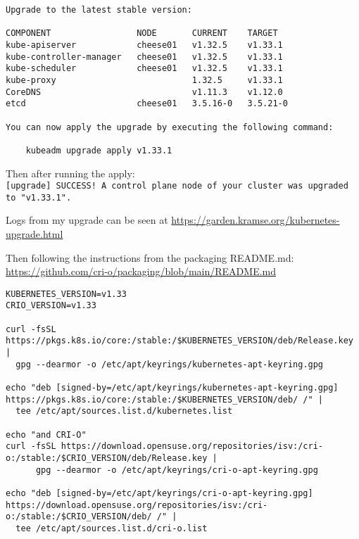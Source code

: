 \documentclass[Screen16to9,17pt]{foils}
\begin{document}

\begin{verbatim}
Upgrade to the latest stable version:

COMPONENT                 NODE       CURRENT    TARGET
kube-apiserver            cheese01   v1.32.5    v1.33.1
kube-controller-manager   cheese01   v1.32.5    v1.33.1
kube-scheduler            cheese01   v1.32.5    v1.33.1
kube-proxy                           1.32.5     v1.33.1
CoreDNS                              v1.11.3    v1.12.0
etcd                      cheese01   3.5.16-0   3.5.21-0

You can now apply the upgrade by executing the following command:

	kubeadm upgrade apply v1.33.1
\end{verbatim}

Then after running the apply:\\{\scriptsize
\verb+[upgrade] SUCCESS! A control plane node of your cluster was upgraded to "v1.33.1".+}

Logs from my upgrade can be seen at \url{https://garden.kramse.org/kubernetes-upgrade.html}


Then following the instructions from the packaging README.md:\\
\url{https://github.com/cri-o/packaging/blob/main/README.md}

\begin{verbatim}
KUBERNETES_VERSION=v1.33
CRIO_VERSION=v1.33

curl -fsSL https://pkgs.k8s.io/core:/stable:/$KUBERNETES_VERSION/deb/Release.key |
  gpg --dearmor -o /etc/apt/keyrings/kubernetes-apt-keyring.gpg

echo "deb [signed-by=/etc/apt/keyrings/kubernetes-apt-keyring.gpg]
https://pkgs.k8s.io/core:/stable:/$KUBERNETES_VERSION/deb/ /" |
  tee /etc/apt/sources.list.d/kubernetes.list

echo "and CRI-O"
curl -fsSL https://download.opensuse.org/repositories/isv:/cri-o:/stable:/$CRIO_VERSION/deb/Release.key |
      gpg --dearmor -o /etc/apt/keyrings/cri-o-apt-keyring.gpg

echo "deb [signed-by=/etc/apt/keyrings/cri-o-apt-keyring.gpg]
https://download.opensuse.org/repositories/isv:/cri-o:/stable:/$CRIO_VERSION/deb/ /" |
  tee /etc/apt/sources.list.d/cri-o.list
\end{verbatim}
\end{document}
